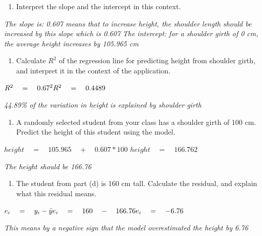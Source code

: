 \documentclass[]{article}
\providecommand{\tightlist}{%
  \setlength{\itemsep}{0pt}\setlength{\parskip}{0pt}}
\begin{document}
\begin{enumerate}
\def\labelenumi{(\alph{enumi})}
\setcounter{enumi}{1}
\tightlist
\item
  Interpret the slope and the intercept in this context.
\end{enumerate}

\emph{The slope is: 0.607 means that to increase height, the shoulder
length should be increased by this slope which is 0.607} \emph{The
intercept: for a shoulder girth of 0 cm, the average height increases by
105.965 cm}

\begin{enumerate}
\def\labelenumi{(\alph{enumi})}
\setcounter{enumi}{2}
\tightlist
\item
  Calculate \(R^2\) of the regression line for predicting height from
  shoulder girth, and interpret it in the context of the application.
\end{enumerate}

\({ { R } }^{ 2 }\quad =\quad { 0.67 }^{ 2 }\\ { { R } }^{ 2 }\quad =\quad 0.4489\)

\emph{44.89\% of the variation in height is explained by shoulder girth}

\begin{enumerate}
\def\labelenumi{(\alph{enumi})}
\setcounter{enumi}{3}
\tightlist
\item
  A randomly selected student from your class has a shoulder girth of
  100 cm. Predict the height of this student using the model.
\end{enumerate}

\(height\quad =\quad 105.965\quad +\quad 0.607*100\)
\(height\quad =\quad 166.762\)

\emph{The height should be 166.76}

\begin{enumerate}
\def\labelenumi{(\alph{enumi})}
\setcounter{enumi}{4}
\tightlist
\item
  The student from part (d) is 160 cm tall. Calculate the residual, and
  explain what this residual means.
\end{enumerate}

\({ e }_{ i }\quad =\quad { y }_{ i }-\bar{ y } \\ { e }_{ i }\quad =\quad 160\quad -\quad 166.76\\ { e }_{ i }\quad =\quad -6.76\)

\emph{This means by a negative sign that the model overestimated the
height by 6.76}
\end{document}
